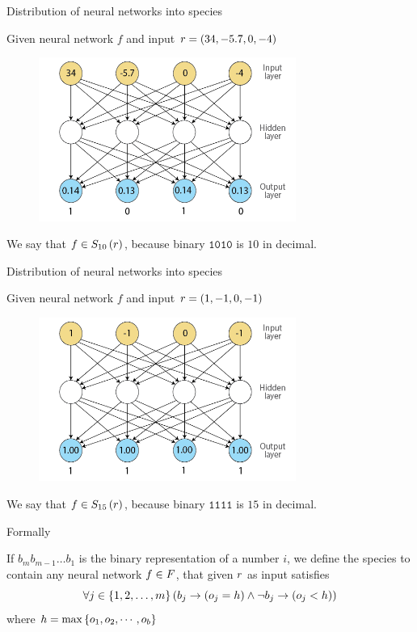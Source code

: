 \begin{frame}{Distribution of neural networks into species}
\begin{center}
Given neural network $f$ and input $r = (34, -5.7, 0, -4)$
  \begin{figure}[p]
  \includegraphics[width=0.75\textwidth]{images/nntdexample2.png}
  \end{figure}
We say that $f \in S_{10}\left(r\right)$, because binary $\texttt{1010}$ is $10$ in decimal.
\end{center}
\end{frame}

\begin{frame}{Distribution of neural networks into species}
\begin{center}
Given neural network $f$ and input $r = (1, -1, 0, -1)$
  \begin{figure}[p]
  \includegraphics[width=0.75\textwidth]{images/nntdexample3.png}
  \end{figure}
We say that $f \in S_{15}\left(r\right)$, because binary $\texttt{1111}$ is $15$ in decimal.
\end{center}
\end{frame}

\begin{frame}{Formally}
\begin{center}
If $b_{m}b_{m-1}\dots b_1$ is the binary representation of a number $i$, we define the species  to contain any neural network $f \in F$, that given $r$ as input satisfies
\begin{equation}
  \forall j \in \left\{ 1, 2, \dots, m \right\} \left(b_j \rightarrow (o_j = h) \wedge \neg b_j \rightarrow (o_j < h)\right)
\end{equation}
where $h = \max\left\{ o_1, o_2, \cdots, o_b \right\}$
\end{center}
\end{frame}


